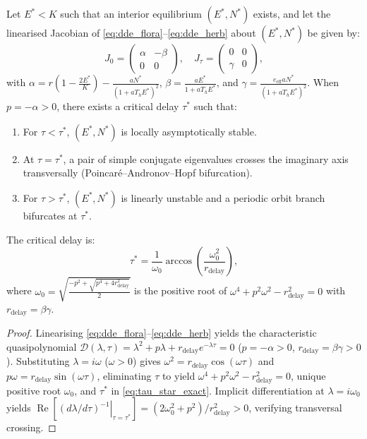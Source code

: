 \begin{proposition}
\label{thm:hopf_limit_cycle}
Let $E^* < K$ such that an interior equilibrium $(E^*, N^*)$ exists, and let the linearised Jacobian of \eqref{eq:dde_flora}--\eqref{eq:dde_herb} about $(E^*, N^*)$ be given by:
\begin{equation}
  J_0 = \begin{pmatrix} \alpha & -\beta \\ 0 & 0 \end{pmatrix}, \quad J_\tau = \begin{pmatrix} 0 & 0 \\ \gamma & 0 \end{pmatrix},
\end{equation}
with $\alpha = r\left(1 - \frac{2E^*}{K}\right) - \frac{a N^*}{(1 + a T_h E^*)^2}$, $\beta = \frac{a E^*}{1 + a T_h E^*}$, and $\gamma = \frac{e_{\mathrm{eff}} a N^*}{(1 + a T_h E^*)^2}$. When $p = -\alpha > 0$, there exists a critical delay $\tau^*$ such that:
\begin{enumerate}
  \item For $\tau < \tau^*$, $(E^*, N^*)$ is locally asymptotically stable.
  \item At $\tau = \tau^*$, a pair of simple conjugate eigenvalues crosses the imaginary axis transversally (Poincaré--Andronov--Hopf bifurcation).
  \item For $\tau > \tau^*$, $(E^*, N^*)$ is linearly unstable and a periodic orbit branch bifurcates at $\tau^*$.
\end{enumerate}
The critical delay is:
\begin{equation}
  \tau^* = \frac{1}{\omega_0} \arccos\left( \frac{\omega_0^2}{r_{\mathrm{delay}}} \right),
  \label{eq:tau_star_exact}
\end{equation}
where $\omega_0 = \sqrt{\frac{-p^2 + \sqrt{p^4 + 4 r_{\mathrm{delay}}^2}}{2}}$ is the positive root of $\omega^4 + p^2\omega^2 - r_{\mathrm{delay}}^2 = 0$ with $r_{\mathrm{delay}} = \beta \gamma$.
\end{proposition}

\begin{proof}
Linearising \eqref{eq:dde_flora}--\eqref{eq:dde_herb} yields the characteristic quasipolynomial $\mathcal{D}(\lambda, \tau) = \lambda^2 + p\lambda + r_{\mathrm{delay}} e^{-\lambda\tau} = 0$ ($p = -\alpha > 0$, $r_{\mathrm{delay}} = \beta\gamma > 0$). Substituting $\lambda = i\omega$ ($\omega > 0$) gives $\omega^2 = r_{\mathrm{delay}}\cos(\omega\tau)$ and $p\omega = r_{\mathrm{delay}}\sin(\omega\tau)$, eliminating $\tau$ to yield $\omega^4 + p^2\omega^2 - r_{\mathrm{delay}}^2 = 0$, unique positive root $\omega_0$, and $\tau^*$ in \eqref{eq:tau_star_exact}. Implicit differentiation at $\lambda = i\omega_0$ yields $\operatorname{Re}\!\left[\left.(d\lambda/d\tau)^{-1}\right|_{\tau=\tau^*}\right] = (2\omega_0^2 + p^2)/r_{\mathrm{delay}}^2 > 0$, verifying transversal crossing.
\end{proof}

